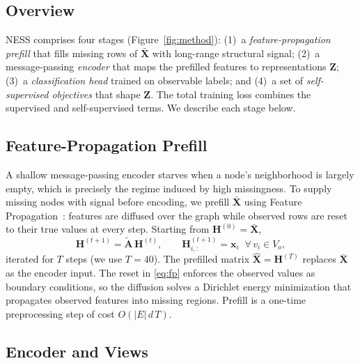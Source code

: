\subsection{Overview}
\label{sec:method-overview}

NESS comprises four stages (Figure~\ref{fig:method}): (1)~a \emph{feature-propagation prefill} that fills missing rows of $\bar{\mathbf{X}}$ with long-range
structural signal; (2)~a message-passing \emph{encoder} that maps the prefilled
features to representations $\mathbf{Z}$; (3)~a \emph{classification head} trained
on observable labels; and (4)~a set of \emph{self-supervised objectives} that
shape $\mathbf{Z}$. The total training loss combines the supervised and
self-supervised terms. We describe each stage below.

\subsection{Feature-Propagation Prefill}
\label{sec:method-prefill}

A shallow message-passing encoder starves when a node's neighborhood is largely
empty, which is precisely the regime induced by high missingness. To supply
missing nodes with signal before encoding, we prefill $\bar{\mathbf{X}}$ using
Feature Propagation~\cite{rossi2022unreasonable}: features are diffused over the graph while observed
rows are reset to their true values at every step. Starting from
$\mathbf{H}^{(0)}=\bar{\mathbf{X}}$,
\begin{equation}
    \label{eq:fp}
    \mathbf{H}^{(t+1)} = \tilde{\mathbf{A}}\,\mathbf{H}^{(t)},
    \qquad
    \mathbf{H}^{(t+1)}_{i,:} = \mathbf{x}_i \;\; \forall\, v_i \in V_o,
\end{equation}
iterated for $T$ steps (we use $T=40$). The prefilled matrix
$\hat{\mathbf{X}}=\mathbf{H}^{(T)}$ replaces $\bar{\mathbf{X}}$ as the encoder
input. The reset in \eqref{eq:fp} enforces the observed values as boundary
conditions, so the diffusion solves a Dirichlet energy minimization that
propagates observed features into missing regions. Prefill is a one-time
preprocessing step of cost $O(|E|\,d\,T)$.

\subsection{Encoder and Views}
\label{sec:method-encoder}

